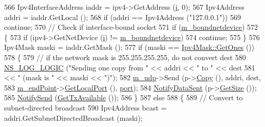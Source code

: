 \begin{DoxyCode}
566           Ipv4InterfaceAddress iaddr = ipv4->GetAddress (\hyperlink{bernuolliDistribution_8m_a6f6ccfcf58b31cb6412107d9d5281426}{i}, 0);
567           Ipv4Address addri = iaddr.GetLocal ();
568           \textcolor{keywordflow}{if} (addri == Ipv4Address (\textcolor{stringliteral}{"127.0.0.1"}))
569             \textcolor{keywordflow}{continue};
570           \textcolor{comment}{// Check if interface-bound socket}
571           \textcolor{keywordflow}{if} (\hyperlink{classns3_1_1Socket_a9781d8dfdb5e9364d5dce8f53b768bb5}{m\_boundnetdevice}) 
572             \{
573               \textcolor{keywordflow}{if} (ipv4->GetNetDevice (\hyperlink{bernuolliDistribution_8m_a6f6ccfcf58b31cb6412107d9d5281426}{i}) != \hyperlink{classns3_1_1Socket_a9781d8dfdb5e9364d5dce8f53b768bb5}{m\_boundnetdevice})
574                 \textcolor{keywordflow}{continue};
575             \}
576           Ipv4Mask maski = iaddr.GetMask ();
577           \textcolor{keywordflow}{if} (maski == \hyperlink{classns3_1_1Ipv4Mask_af712cbdf28c039025d4aa45fa7e243dd}{Ipv4Mask::GetOnes} ())
578             \{
579               \textcolor{comment}{// if the network mask is 255.255.255.255, do not convert dest}
580               \hyperlink{group__logging_ga88acd260151caf2db9c0fc84997f45ce}{NS\_LOG\_LOGIC} (\textcolor{stringliteral}{"Sending one copy from "} << addri << \textcolor{stringliteral}{" to "} << dest
581                                                      << \textcolor{stringliteral}{" (mask is "} << maski << \textcolor{stringliteral}{")"});
582               \hyperlink{classns3_1_1UdpSocketImpl_ace4b90c1ab6f4f302cdb4cd8da973514}{m\_udp}->Send (p->\hyperlink{classns3_1_1Packet_a5d5c70802a5f77fc5f0001e0cfc1898b}{Copy} (), addri, dest,
583                            \hyperlink{classns3_1_1UdpSocketImpl_a4ea3006a4e49185d06360beba92f4073}{m\_endPoint}->\hyperlink{classns3_1_1Ipv4EndPoint_aab137f64770abf94f0b8a81217a0b106}{GetLocalPort} (), 
      \hyperlink{dsdv-manet_8cc_a8e0798404bf2cf5dabb84c5ba9a4f236}{port});
584               \hyperlink{classns3_1_1Socket_ae478fc503f7041a1da5e9db361f1ae20}{NotifyDataSent} (p->\hyperlink{classns3_1_1Packet_a462855c9929954d4301a4edfe55f4f1c}{GetSize} ());
585               \hyperlink{classns3_1_1Socket_a34cd5de5b9feeadd6ba8973b954c3d5f}{NotifySend} (\hyperlink{classns3_1_1UdpSocketImpl_a70191d0578ae26233f569631a26d608b}{GetTxAvailable} ());
586             \}
587           \textcolor{keywordflow}{else}
588             \{
589               \textcolor{comment}{// Convert to subnet-directed broadcast}
590               Ipv4Address bcast = addri.GetSubnetDirectedBroadcast (maski);

\end{DoxyCode}
